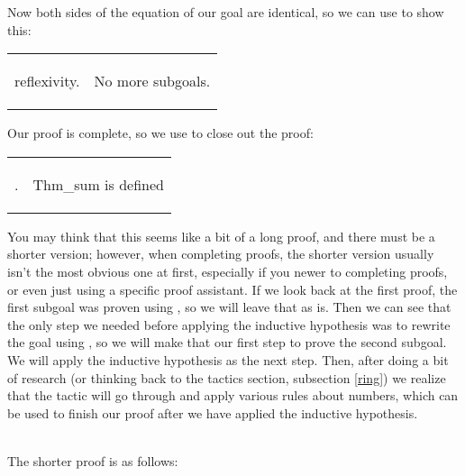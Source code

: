 \noindent 
Now both sides of the equation of our goal are identical, so we can use  to show this: 

\hspace{-1cm}
\begin{tabular}{p{8cm} p{8cm}}
\begin{code}
reflexivity.
\end{code}
&
\begin{goal}
No more subgoals.
\end{goal}
\end{tabular}



\noindent 
Our proof is complete, so we use  to close out the proof:

\hspace{-1cm}
\begin{tabular}{p{8cm} p{8cm}}
\begin{code}
\Qed.
\end{code}
&
\begin{msg}
Thm\_sum is defined
\end{msg}
\end{tabular}



\noindent 
You may think that this seems like a bit of a long proof, and there must be a shorter version; 
however, when completing proofs, the shorter version usually isn't the most obvious one at first, 
especially if you newer to completing proofs, or even just using a specific proof assistant. 
If we look back at the first proof, the first subgoal was proven using , so we will leave that as is. 
Then we can see that the only step we needed before applying the inductive hypothesis was to rewrite the goal using , so we will make that our first step to prove the second subgoal. 
We will apply the inductive hypothesis as the next step. 
Then, after doing a bit of research (or thinking back to the tactics section, subsection \ref{ring}) we realize that the tactic  will go through and apply various rules about numbers, which can be used to finish our proof after we have applied the inductive hypothesis. 

~\\ \noindent
The shorter proof is as follows:  

